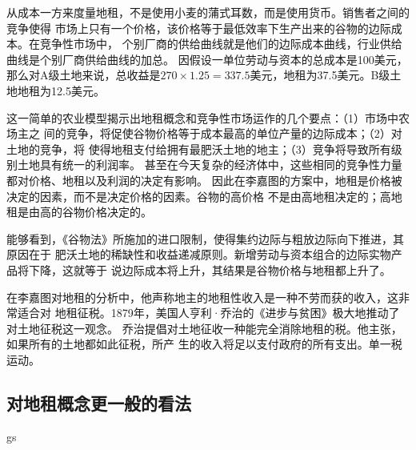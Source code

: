 从成本一方来度量地租，不是使用小麦的蒲式耳数，而是使用货币。销售者之间的竞争使得
市场上只有一个价格，该价格等于最低效率下生产出来的谷物的边际成本。在竞争性市场中，
个别厂商的供给曲线就是他们的边际成本曲线，行业供给曲线是个别厂商供给曲线的加总。
因假设一单位劳动与资本的总成本是100美元，那么对A级土地来说，总收益是$270 \times
1.25 = 337.5$美元，地租为37.5美元。B级土地地租为12.5美元。

这一简单的农业模型揭示出地租概念和竞争性市场运作的几个要点：（1）市场中农场主之
间的竞争，将促使谷物价格等于成本最高的单位产量的边际成本；（2）对土地的竞争，将
使得地租支付给拥有最肥沃土地的地主；（3）竞争将导致所有级别土地具有统一的利润率。
甚至在今天复杂的经济体中，这些相同的竞争性力量都对价格、地租以及利润的决定有影响。
因此在李嘉图的方案中，地租是价格被决定的因素，而不是决定价格的因素。谷物的高价格
不是由高地租决定的；高地租是由高的谷物价格决定的。

能够看到，《谷物法》所施加的进口限制，使得集约边际与粗放边际向下推进，其原因在于
肥沃土地的稀缺性和收益递减原则。新增劳动与资本组合的边际实物产品将下降，这就等于
说边际成本将上升，其结果是谷物价格与地租都上升了。

在李嘉图对地租的分析中，他声称地主的地租性收入是一种不劳而获的收入，这非常适合对
地租征税。1879年，美国人亨利·乔治的《进步与贫困》极大地推动了对土地征税这一观念。
乔治提倡对土地征收一种能完全消除地租的税。他主张，如果所有的土地都如此征税，所产
生的收入将足以支付政府的所有支出。单一税运动。

\subsection{对地租概念更一般的看法}
 gs